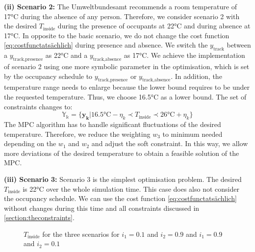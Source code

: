 \textbf{(ii) Scenario 2:}\newline
The Umweltbundesamt \cite{Umweltbundesamt.7.10.2021} recommends a room temperature of 17°C during the absence of any person. Therefore, we consider scenario 2 with the desired $T_\text{inside}$ during the presence of occupants at 22°C and during absence at 17°C. In opposite to the basic scenario, we do not change the cost function \ref{eq:costfunctatsächlich} during presence and absence. We switch the $y_\text{track}$ between a $y_\text{track,presence}$ as 22°C and a $y_\text{track,absence}$ as 17°C. We achieve the implementation of scenario 2 using one more symbolic parameter in the optimisation, which is set by the occupancy schedule to $y_\text{track,presence}$ or $y_\text{track,absence}$. In addition, the temperature range needs to enlarge because the lower bound requires to be under the requested temperature. Thus, we choose 16.5°C as a lower bound. The set of constraints changes to:
\begin{equation}
    \label{ConstraintYScenario2}
    \mathbb{Y_k} = \{\mathbf{y_k}| 16.5 \text{°C} - \eta_k \prec T_\text{inside} \prec 26 \text{°C}+ \eta_k\} 
\end{equation}
The MPC algorithm has to handle significant fluctuations of the desired temperature. Therefore, we reduce the weighting $w_\text{3}$ to minimum needed depending on the $w_\text{1}$ and $w_\text{2}$ and adjust the soft constraint. In this way, we allow more deviations of the desired temperature to obtain a feasible solution of the MPC. \newline 

\textbf{(iii) Scenario 3:}\newline
Scenario 3 is the simplest optimisation problem. The desired $T_\text{inside}$ is 22°C over the whole simulation time. This case does also not consider the occupancy schedule. We can use the cost function \ref{eq:costfunctatsächlich} without changes during this time and all constraints discussed in \autoref{section:theconstraints}.

    \begin{figure}[H]
           \centering
        \def\svgwidth{1\textwidth}
        
        \caption{$T_\text{inside}$ for the three scenarios for $i_\text{1} = 0.1$ and $i_\text{2} = 0.9$ and $i_\text{1} = 0.9$ and $i_\text{2} = 0.1$}
         \label{fig:TemperaturverlaufScenarien}
    \end{figure}

